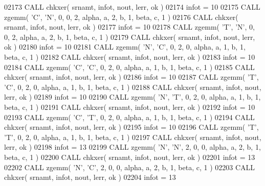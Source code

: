 \begin{DoxyCode}
02173       \textcolor{keyword}{CALL }chkxer( srnamt, infot, nout, lerr, ok )
02174       infot = 10
02175       \textcolor{keyword}{CALL }zgemm( \textcolor{stringliteral}{'C'}, \textcolor{stringliteral}{'N'}, 0, 0, 2, alpha, a, 2, b, 1, beta, c, 1 )
02176       \textcolor{keyword}{CALL }chkxer( srnamt, infot, nout, lerr, ok )
02177       infot = 10
02178       \textcolor{keyword}{CALL }zgemm( \textcolor{stringliteral}{'T'}, \textcolor{stringliteral}{'N'}, 0, 0, 2, alpha, a, 2, b, 1, beta, c, 1 )
02179       \textcolor{keyword}{CALL }chkxer( srnamt, infot, nout, lerr, ok )
02180       infot = 10
02181       \textcolor{keyword}{CALL }zgemm( \textcolor{stringliteral}{'N'}, \textcolor{stringliteral}{'C'}, 0, 2, 0, alpha, a, 1, b, 1, beta, c, 1 )
02182       \textcolor{keyword}{CALL }chkxer( srnamt, infot, nout, lerr, ok )
02183       infot = 10
02184       \textcolor{keyword}{CALL }zgemm( \textcolor{stringliteral}{'C'}, \textcolor{stringliteral}{'C'}, 0, 2, 0, alpha, a, 1, b, 1, beta, c, 1 )
02185       \textcolor{keyword}{CALL }chkxer( srnamt, infot, nout, lerr, ok )
02186       infot = 10
02187       \textcolor{keyword}{CALL }zgemm( \textcolor{stringliteral}{'T'}, \textcolor{stringliteral}{'C'}, 0, 2, 0, alpha, a, 1, b, 1, beta, c, 1 )
02188       \textcolor{keyword}{CALL }chkxer( srnamt, infot, nout, lerr, ok )
02189       infot = 10
02190       \textcolor{keyword}{CALL }zgemm( \textcolor{stringliteral}{'N'}, \textcolor{stringliteral}{'T'}, 0, 2, 0, alpha, a, 1, b, 1, beta, c, 1 )
02191       \textcolor{keyword}{CALL }chkxer( srnamt, infot, nout, lerr, ok )
02192       infot = 10
02193       \textcolor{keyword}{CALL }zgemm( \textcolor{stringliteral}{'C'}, \textcolor{stringliteral}{'T'}, 0, 2, 0, alpha, a, 1, b, 1, beta, c, 1 )
02194       \textcolor{keyword}{CALL }chkxer( srnamt, infot, nout, lerr, ok )
02195       infot = 10
02196       \textcolor{keyword}{CALL }zgemm( \textcolor{stringliteral}{'T'}, \textcolor{stringliteral}{'T'}, 0, 2, 0, alpha, a, 1, b, 1, beta, c, 1 )
02197       \textcolor{keyword}{CALL }chkxer( srnamt, infot, nout, lerr, ok )
02198       infot = 13
02199       \textcolor{keyword}{CALL }zgemm( \textcolor{stringliteral}{'N'}, \textcolor{stringliteral}{'N'}, 2, 0, 0, alpha, a, 2, b, 1, beta, c, 1 )
02200       \textcolor{keyword}{CALL }chkxer( srnamt, infot, nout, lerr, ok )
02201       infot = 13
02202       \textcolor{keyword}{CALL }zgemm( \textcolor{stringliteral}{'N'}, \textcolor{stringliteral}{'C'}, 2, 0, 0, alpha, a, 2, b, 1, beta, c, 1 )
02203       \textcolor{keyword}{CALL }chkxer( srnamt, infot, nout, lerr, ok )
02204       infot = 13

\end{DoxyCode}
